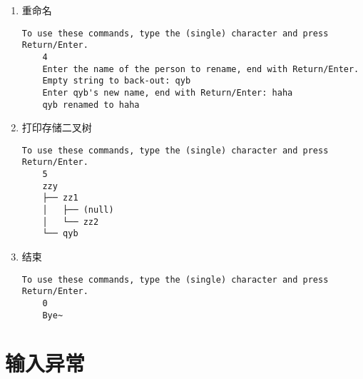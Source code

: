 \begin{enumerate}
    \item 重命名
\begin{lstlisting}[style=console]
    To use these commands, type the (single) character and press Return/Enter.
    4
    Enter the name of the person to rename, end with Return/Enter.
    Empty string to back-out: qyb
    Enter qyb's new name, end with Return/Enter: haha
    qyb renamed to haha
\end{lstlisting}

    \item 打印存储二叉树
\begin{lstlisting}[style=console]
    To use these commands, type the (single) character and press Return/Enter.
    5
    zzy
    ├── zz1
    │   ├── (null)
    │   └── zz2
    └── qyb
\end{lstlisting}

    \item 结束
\begin{lstlisting}[style=console]
    To use these commands, type the (single) character and press Return/Enter.
    0
    Bye~
\end{lstlisting}
\end{enumerate}


\section{输入异常}

